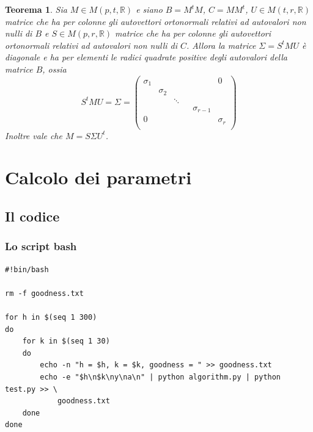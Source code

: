 \documentclass[12pt,a4paper]{article}
\theoremstyle{thm}
\newtheorem{theorem}{Teorema}[section]
\theoremstyle{def}
\begin{document}
\begin{theorem}
Sia $M \in M(p,t, \mathds{R})$ e siano $B = M^tM$, $C = MM^t$, $U \in M (t, r, \mathds{R})$ matrice che ha per colonne gli autovettori ortonormali relativi ad autovalori non nulli di $B$ e $S \in M(p,r, \mathds{R})$ matrice che ha per colonne gli autovettori ortonormali relativi ad autovalori non nulli di $C$. Allora la matrice $\Sigma = S^tMU$ è diagonale e ha per elementi le radici quadrate positive degli autovalori della matrice $B$, ossia
\[
S^tMU = \Sigma = \begin{pmatrix} \sigma_1 & & & & & 0 \\ & \sigma_2 & & & & \\ & & \ddots & & & \\ & & & & \sigma_{r-1} & \\ 0 & & & & & \sigma_r \\ \end{pmatrix}
\]
Inoltre vale che $M = S \Sigma U^t$.
\end{theorem}

\section{Calcolo dei parametri}

\label{appendice2}


\subsection{Il codice}


\subsubsection{Lo script bash}

\begin{verbatim}
#!bin/bash

rm -f goodness.txt

for h in $(seq 1 300)
do
	for k in $(seq 1 30)
	do
		echo -n "h = $h, k = $k, goodness = " >> goodness.txt
		echo -e "$h\n$k\ny\na\n" | python algorithm.py | python test.py >> \
			goodness.txt
	done
done
\end{verbatim}
\end{document}
